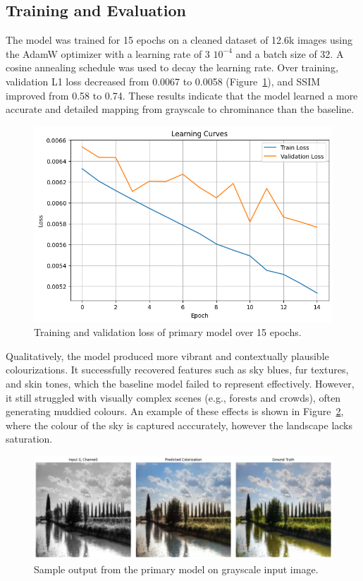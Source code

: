 \documentclass{article} %
\begin{document}
\subsection{Training and Evaluation}

The model was trained for 15 epochs on a cleaned dataset of 12.6k images using the AdamW optimizer with a learning rate of 3 \texttimes $10^{-4}$ and a batch size of 32. A cosine annealing schedule was used to decay the learning rate. Over training, validation L1 loss decreased from 0.0067 to 0.0058 (Figure~\ref{fig:primary_learning_curve}), and SSIM improved from 0.58 to 0.74. These results indicate that the model learned a more accurate and detailed mapping from grayscale to chrominance than the baseline.

\begin{figure}[htbp]
    \centering
    \includegraphics[width=\textwidth]{Figs/primary_learning_curve.png}
    \caption{Training and validation loss of primary model over 15 epochs.}
    \label{fig:primary_learning_curve}
\end{figure}

Qualitatively, the model produced more vibrant and contextually plausible colourizations. It successfully recovered features such as sky blues, fur textures, and skin tones, which the baseline model failed to represent effectively. However, it still struggled with visually complex scenes (e.g., forests and crowds), often generating muddied colours. An example of these effects is shown in Figure~\ref{fig:primary_model_results}, where the colour of the sky is captured acccurately, however the landscape lacks saturation.

\begin{figure}[htbp]
    \centering
    \includegraphics[width=\textwidth]{Figs/primary_model_results.png}
    \caption{Sample output from the primary model on grayscale input image.}
    \label{fig:primary_model_results}
\end{figure}
\end{document}

